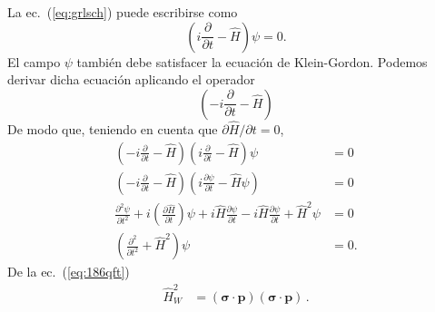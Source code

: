 \begin{frame}
La ec.~(\ref{eq:grlsch}) puede escribirse como
\begin{equation}
  \left(i\frac{\partial}{\partial t}-\hat{H}\right)\psi=0.
\end{equation}
El campo $\psi$ también debe satisfacer la ecuación de Klein-Gordon. Podemos derivar dicha ecuación aplicando el operador
\begin{equation*}
  \left(-i\frac{\partial}{\partial t}-\hat{H}\right)
\end{equation*}
De modo que, teniendo en cuenta que $\partial\hat H/\partial t=0$,
\begin{align}
  \label{eq:2qftw}
 \left(-i\frac{\partial}{\partial t}-\hat{H}\right)\left(i\frac{\partial}{\partial t}-\hat{H}\right)\psi&=0\nonumber\\
 \left(-i\frac{\partial}{\partial t}-\hat{H}\right)\left(i\frac{\partial\psi}{\partial t}-\hat{H}\psi\right)&=0\nonumber\\
 \frac{\partial^2\psi}{\partial t^2}+i\left(\frac{\partial\hat{H}}{\partial t}\right)\psi
 +i\hat{H}\frac{\partial\psi}{\partial t}-i\hat{H}\frac{\partial\psi}{\partial t}+\hat{H}^2\psi&=0\nonumber\\
 \left(\frac{\partial^2}{\partial t^2}+\hat{H}^2\right)\psi&=0.
\end{align}
% 
De la ec.~(\ref{eq:186qft})
\begin{align}
\label{eq:106qft}
\hat{H}^2_W&=(\boldsymbol\sigma\cdot\boldsymbol{p})(\boldsymbol\sigma\cdot\boldsymbol{p})\,.
\end{align}
\end{frame}

